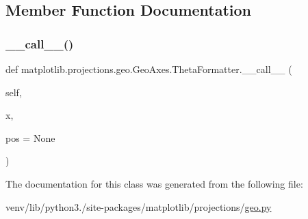 \subsection{Member Function Documentation}
\mbox{\label{classmatplotlib_1_1projections_1_1geo_1_1GeoAxes_1_1ThetaFormatter_a0f8e93f1bac2ad34671d6a4f08468009}} 
\subsubsection{\texorpdfstring{\+\_\+\+\_\+call\+\_\+\+\_\+()}{\_\_call\_\_()}}
{\footnotesize\ttfamily def matplotlib.\+projections.\+geo.\+Geo\+Axes.\+Theta\+Formatter.\+\_\+\+\_\+call\+\_\+\+\_\+ (\begin{DoxyParamCaption}\item[{}]{self,  }\item[{}]{x,  }\item[{}]{pos = {\ttfamily None} }\end{DoxyParamCaption})}



The documentation for this class was generated from the following file\+:\begin{DoxyCompactItemize}
\item 
venv/lib/python3./site-\/packages/matplotlib/projections/\hyperlink{geo_8py}{geo.\+py}\end{DoxyCompactItemize}
